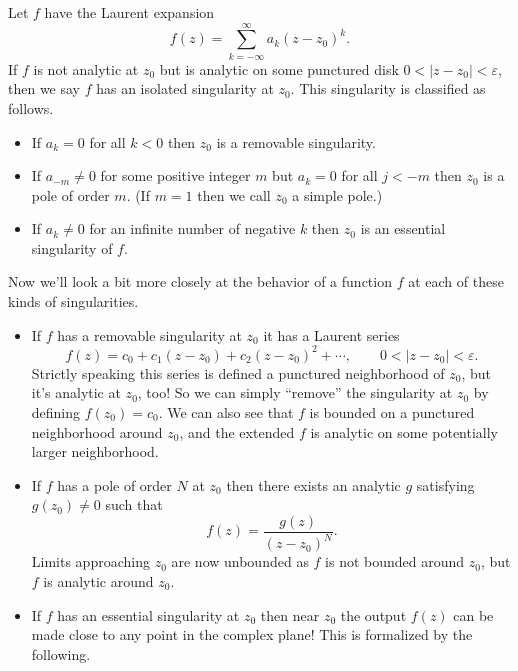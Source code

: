 \documentclass[../m136main.tex]{subfiles}
\begin{document}
\begin{definition}
    Let $f$ have the Laurent expansion
    \[ f(z) = \sum_{k=-\infty}^{\infty} a_k (z - z_0)^{k}. \]
    If $f$ is not analytic at $z_0$ but is analytic on some punctured disk $0 < |z - z_0| < \varepsilon$, then we say $f$ has an isolated singularity at $z_0$.
    This singularity is classified as follows.
    \begin{itemize}[topsep=0pt]
        \item If $a_k = 0$ for all $k < 0$ then $z_0$ is a removable singularity.
        
        \item If $a_{-m} \neq 0$ for some positive integer $m$ but $a_k = 0$ for all $j < -m$ then $z_0$ is a pole of order $m$.
        (If $m=1$ then we call $z_0$ a simple pole.)

        \item If $a_k \neq 0$ for an infinite number of negative $k$ then $z_0$ is an essential singularity of $f$.
    \end{itemize}
\end{definition}

Now we'll look a bit more closely at the behavior of a function $f$ at each of these kinds of singularities.
\begin{itemize}[topsep=0pt]
    \item If $f$ has a removable singularity at $z_0$ it has a Laurent series
    \[ f(z) = c_0 + c_1 (z - z_0) + c_2 (z  - z_0)^2 + \cdots, \qquad 0 < |z - z_0| < \varepsilon. \]
    Strictly speaking this series is defined a punctured neighborhood of $z_0$, but it's analytic at $z_0$, too!
    So we can simply ``remove'' the singularity at $z_0$ by defining $f(z_0) = c_0$.
    We can also see that $f$ is bounded on a punctured neighborhood around $z_0$, and the extended $f$ is analytic on some potentially larger neighborhood.

    \item If $f$ has a pole of order $N$ at $z_0$ then there exists an analytic $g$ satisfying $g(z_0) \neq 0$ such that
    \[ f(z) = \frac{g(z)}{(z - z_0)^{N}}. \]
    Limits approaching $z_0$ are now unbounded as $f$ is not bounded around $z_0$, but $f$ is analytic around $z_0$.

    \item If $f$ has an essential singularity at $z_0$ then near $z_0$ the output $f(z)$ can be made close to any point in the complex plane!
    This is formalized by the following.
\end{itemize}
\end{document}
